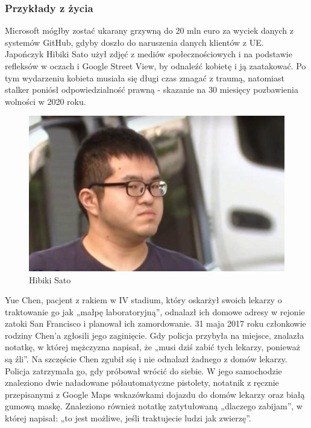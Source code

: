 \subsubsection{Przykłady z życia}
Microsoft mógłby zostać ukarany grzywną do 20 mln euro za wyciek danych z systemów GitHub, gdyby doszło do naruszenia danych klientów z UE.\\

Japończyk Hibiki Sato użył zdjęć z mediów społecznościowych i na podstawie refleksów w oczach i Google Street View, by odnaleźć kobietę i ją zaatakować. Po tym wydarzeniu kobieta musiała się długi czas zmagać z traumą, natomiast stalker poniósł odpowiedzialność prawną - skazanie na 30 miesięcy pozbawienia wolności w 2020 roku.
\begin{figure}[H]
  \centering
  \includegraphics[width=1\textwidth]{images/stalker.jpg}
  \caption{Hibiki Sato}
  \label{fig:stalker}
\end{figure}

Yue Chen, pacjent z rakiem w IV stadium, który oskarżył swoich lekarzy o traktowanie go jak „małpę laboratoryjną”, odnalazł ich domowe adresy w rejonie zatoki San Francisco i planował ich zamordowanie.
31 maja 2017 roku członkowie rodziny Chen'a zgłosili jego zaginięcie. Gdy policja przybyła na miejsce, znalazła notatkę, w której mężczyzna napisał, że „musi dziś zabić tych lekarzy, ponieważ są źli”.
Na szczęście Chen zgubił się i nie odnalazł żadnego z domów lekarzy. Policja zatrzymała go, gdy próbował wrócić do siebie. W jego samochodzie znaleziono dwie naładowane półautomatyczne pistolety, notatnik z ręcznie przepisanymi z Google Maps wskazówkami dojazdu do domów lekarzy oraz białą gumową maskę. Znaleziono również notatkę zatytułowaną „dlaczego zabijam”, w której napisał: „to jest możliwe, jeśli traktujecie ludzi jak zwierzę”.